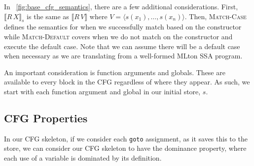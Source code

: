 \documentclass{article}
\begin{document}
In ~\ref{fig:base_cfg_semantics}, there are a few additional considerations. First, $\llbracket R \, X \rrbracket_s$ is the same as $\llbracket R \, V \rrbracket$ where $V = \langle s(x_1), \dots, s(x_n) \rangle$. Then, \textsc{Match-Case} defines the semantics for when we successfully match based on the constructor while \textsc{Match-Default} covers when we do not match on the constructor and execute the default case. Note that we can assume there will be a default case when necessary as we are translating from a well-formed MLton SSA program.

An important consideration is function arguments and globals. These are available to every block in the CFG regardless of where they appear. As such, we start with each function argument and global in our initial store, $s$.

\subsection{CFG Properties}

In our CFG skeleton, if we consider each \texttt{goto} assignment, as it saves this to the store, we can consider our CFG skeleton to have the dominance property, where each use of a variable is dominated by its definition.




\end{document}
